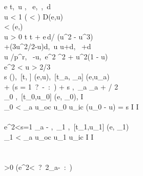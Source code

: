 \documentclass{document}
\newcommand{\diff}{\mathrm d}
\begin{document}
\begin{algorithm}[htb]
	\centering
	\begin{pseudocode}
		\FORALL e  \DO
		\BEGIN
		t,\ u ,\  \GETS e,\ \varphi {},\ \diff\varphi 
		\GETS \epsilon \\
		\WHILE u < 1 \AND (  \OR \varphi < \pi) \DO
		\BEGIN
		\IF {}  \THEN
		  {\mathbb D}(e,u) \GETS [t,\ \Delta=\varphi - \mathrm{arctan2}(u, 
		  \dot{u})]\\
		\IF \varphi < \pi {}(e,\varphi) \GETS [t,\ u]\\
		\IF u > 0 \THEN t \GETS t + e\,\diff\varphi / (u^2 - u^3)\\
		\GETS {}+(3u^2/2-u)\diff\varphi,\ u \GETS 
		u+\diff\varphi,\ \varphi \GETS 
		\varphi+\diff\varphi
		\END
		\END
		\ENDPROCEDURE
		\\
		u /p^r,\  \GETS -u\cot\delta,\ e^2 \GETS {}^2 + u^2(1 - 
		u)\\
		\IF e^2 < \mu \AND u > 2/3 \THEN \RETURN{\infty,\emptyset}\\
		s \GETS {}(),\ [t, \Delta] (e,u),\ [t_a, 
		\Delta_a] (e,u_a)\\
		\varphi \GETS \Delta + (s = 1\ ?\ \pi-\delta\ :\ 
		\delta) + s \alpha,\ \varphi_a \GETS \Delta_a + \pi / 2\\
		\varphi_0 \GETS \varphi \mod \pi,\ [t_0,u_0] (e, 
		\varphi_0), I \GETS \emptyset\\
		\IF \varphi_0 < \varphi_a \AND u_{oc} \le u_0 \le u_{ic} \AND 
		(u_0 - u) = s \THEN \DO
		\BEGIN
		I \GETS I \\
		\END\\
		\IF e^2<\mu \AND s=1 \THEN \DO
		\BEGIN
		\varphi {}\varphi_a - \varphi,\ \varphi_1 \GETS \varphi \mod \pi,\ 
		[t_1,u_1] (e, \varphi_1)\\
		\IF \varphi_1 < \varphi_a \AND u_{oc} \le u_1 \le u_{ic} \THEN \DO
		\BEGIN
		I \GETS I \\
		\END\\
		\END\\
		\IF {}>0 \THEN \Delta \GETS (e^2<\mu\ ?\ 2\Delta_a-\Delta\ :\ \infty)\\
		\\
		\ENDPROCEDURE
	\end{pseudocode}
	\caption{\label{fig:algo} \textsc{Precompute} is based  
	on~\eqref{eq:motionconstants}, \eqref{eq:rayequation} and the properties 	
	illustrated in Fig.~\ref{fig:notations:d}. \textsc{TraceRay} uses the 	
	properties and symmetries presented in Section~\ref{sec:properties}.}
\end{algorithm}
\end{document}
